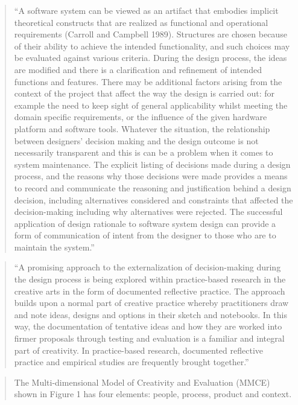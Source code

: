 \begin{quote}
  ``A software system can be viewed as an artifact that embodies implicit theoretical constructs that are realized as functional and operational requirements (Carroll and Campbell 1989). Structures are chosen because of their ability to achieve the intended functionality, and such choices may be evaluated against various criteria. During the design process, the ideas are modified and there is a clarification and refinement of intended functions and features. There may be additional factors arising from the context of the project that affect the way the design is carried out: for example the need to keep sight of general applicability whilst meeting the domain specific requirements, or the influence of the given hardware platform and software tools. Whatever the situation, the relationship between designers' decision making and the design outcome is not necessarily transparent and this is can be a problem when it comes to system maintenance. The explicit listing of decisions made during a design process, and the reasons why those decisions were made provides a means to record and communicate the reasoning and justification behind a design decision, including alternatives considered and constraints that affected the decision-making including why alternatives were rejected. The successful application of design rationale to software system design can provide a form of communication of intent from the designer to those who are to maintain the system.'' \autocite[p.9]{Candy2012}
\end{quote}

\begin{quote}
  ``A promising approach to the externalization of decision-making during the design process is being explored within practice-based research in the creative arts in the form of documented reflective practice. The approach builds upon a normal part of creative practice whereby practitioners draw and note ideas, designs and options in their sketch and notebooks. In this way, the documentation of tentative ideas and how they are worked into firmer proposals through testing and evaluation is a familiar and integral part of creativity. In practice-based research, documented reflective practice and empirical studies are frequently brought together.'' \autocite[p.10]{Candy2012}
\end{quote}

\begin{quote}
  The Multi-dimensional Model of Creativity and Evaluation (MMCE) shown in Figure 1 has four elements: people, process, product and context. \autocite[p.11]{Candy2012}
\end{quote}

